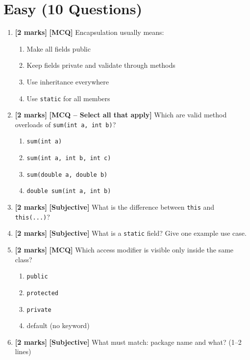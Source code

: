 \documentclass[11pt,a4paper]{article}
\newcommand{\EMarks}{\textbf{[2 marks]} }
\begin{document}
\section*{Easy (10 Questions)}
\begin{enumerate}[label=\textbf{E\arabic*.}, leftmargin=*]
  \item \EMarks \textbf{[MCQ]} Encapsulation usually means:
    \begin{enumerate}[label=(\Alph*), leftmargin=*]
      \item Make all fields public
      \item Keep fields private and validate through methods
      \item Use inheritance everywhere
      \item Use \texttt{static} for all members
    \end{enumerate}

  \item \EMarks \textbf{[MCQ -- Select all that apply]} Which are valid method overloads of \texttt{sum(int a, int b)}?
    \begin{enumerate}[label=(\Alph*), leftmargin=*]
      \item \texttt{sum(int a)}
      \item \texttt{sum(int a, int b, int c)}
      \item \texttt{sum(double a, double b)}
      \item \texttt{double sum(int a, int b)}
    \end{enumerate}

  \item \EMarks \textbf{[Subjective]} What is the difference between \texttt{this} and \texttt{this(...)}?

  \item \EMarks \textbf{[Subjective]} What is a \texttt{static} field? Give one example use case.

  \item \EMarks \textbf{[MCQ]} Which access modifier is visible only inside the same class?
    \begin{enumerate}[label=(\Alph*), leftmargin=*]
      \item \texttt{public}
      \item \texttt{protected}
      \item \texttt{private}
      \item default (no keyword)
    \end{enumerate}

  \item \EMarks \textbf{[Subjective]} What must match: package name and what? (1--2 lines)


\end{enumerate}
\end{document}
